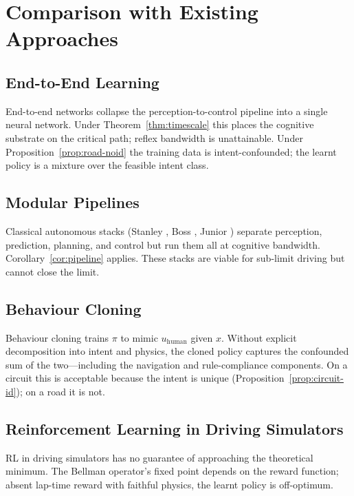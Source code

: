 \documentclass[11pt,twocolumn]{article}
\theoremstyle{definition}
\theoremstyle{remark}
\begin{document}
\section{Comparison with Existing Approaches}
\label{sec:comparison}

\subsection{End-to-End Learning}

End-to-end networks \cite{bojarski2016endtoend,bansal2019chauffeurnet,codevilla2018endtoend} collapse the perception-to-control pipeline into a single neural network. Under Theorem~\ref{thm:timescale} this places the cognitive substrate on the critical path; reflex bandwidth is unattainable. Under Proposition~\ref{prop:road-noid} the training data is intent-confounded; the learnt policy is a mixture over the feasible intent class.

\subsection{Modular Pipelines}

Classical autonomous stacks (Stanley \cite{thrun2006stanley}, Boss \cite{urmson2008boss}, Junior \cite{levinson2011junior}) separate perception, prediction, planning, and control but run them all at cognitive bandwidth. Corollary~\ref{cor:pipeline} applies. These stacks are viable for sub-limit driving but cannot close the limit.

\subsection{Behaviour Cloning}

Behaviour cloning trains $\pi$ to mimic $u_{\mathrm{human}}$ given $x$. Without explicit decomposition into intent and physics, the cloned policy captures the confounded sum of the two---including the navigation and rule-compliance components. On a circuit this is acceptable because the intent is unique (Proposition~\ref{prop:circuit-id}); on a road it is not.

\subsection{Reinforcement Learning in Driving Simulators}

RL in driving simulators \cite{kendall2019learning,mnih2015human,bellemare2013arcade} has no guarantee of approaching the theoretical minimum. The Bellman operator's fixed point depends on the reward function; absent lap-time reward with faithful physics, the learnt policy is off-optimum.
\end{document}
